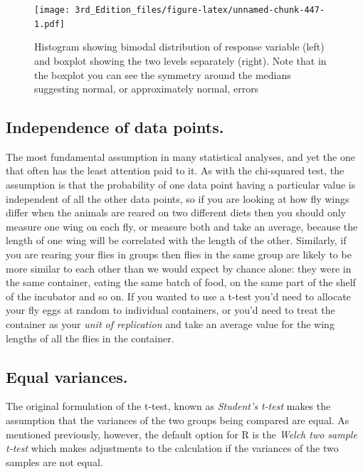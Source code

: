 \documentclass[
]{book}
\begin{document}
\begin{figure}
\centering
\texttt{[image: 3rd\_Edition\_files/figure-latex/unnamed-chunk-447-1.pdf]}
\caption{\label{fig:unnamed-chunk-447}Histogram showing bimodal distribution of response variable (left) and boxplot showing the two levels separately (right). Note that in the boxplot you can see the symmetry around the medians suggesting normal, or approximately normal, errors}
\end{figure}

\hypertarget{independence-of-data-points.}{%
\subsection{Independence of data points.}\label{independence-of-data-points.}}

The most fundamental assumption in many statistical analyses, and yet the one that often has the least attention paid to it. As with the chi-squared test, the assumption is that the probability of one data point having a particular value is independent of all the other data points, so if you are looking at how fly wings differ when the animals are reared on two different diets then you should only measure one wing on each fly, or measure both and take an average, because the length of one wing will be correlated with the length of the other. Similarly, if you are rearing your flies in groups then flies in the same group are likely to be more similar to each other than we would expect by chance alone: they were in the same container, eating the same batch of food, on the same part of the shelf of the incubator and so on. If you wanted to use a t-test you'd need to allocate your fly eggs at random to individual containers, or you'd need to treat the container as your \emph{unit of replication} and take an average value for the wing lengths of all the flies in the container.

\hypertarget{equal-variances.}{%
\subsection{Equal variances.}\label{equal-variances.}}

The original formulation of the t-test, known as \emph{Student's t-test} makes the assumption that the variances of the two groups being compared are equal. As mentioned previously, however, the default option for R is the \emph{Welch two sample t-test} which makes adjustments to the calculation if the variances of the two samples are not equal.
\end{document}
